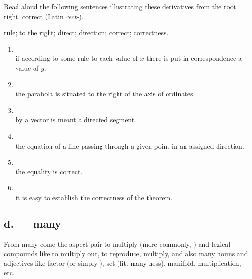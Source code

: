 \begin{keybox}[Exercise 5.9]
Read aloud the following sentences illustrating these derivatives from the root  right, correct (Latin \emph{rect-}).
\end{keybox}

\noindent{} rule;  to the right;  direct;  direction;  correct;  correctness.

\begin{enumerate}[label=\arabic*)]
\item {}\\
      if according to some rule to each value of $x$ there is put in correspondence a value of $y$.
\item {}\\
      the parabola is situated to the right of the axis of ordinates.
\item {}\\
      by a vector is meant a directed segment.
\item {}\\
      the equation of a line passing through a given point in an assigned direction.
\item {}\\
      the equality is correct.
\item {}\\
      it is easy to establish the correctness of the theorem.
\end{enumerate}

\subsection*{d.  --- many}

From  many come the aspect-pair  to multiply (more commonly, ) and lexical compounds like  to multiply out,  to reproduce, multiply, and also many nouns and adjectives like  factor (or simply ),  set (lit. many-ness),  manifold,  multiplication, etc.

